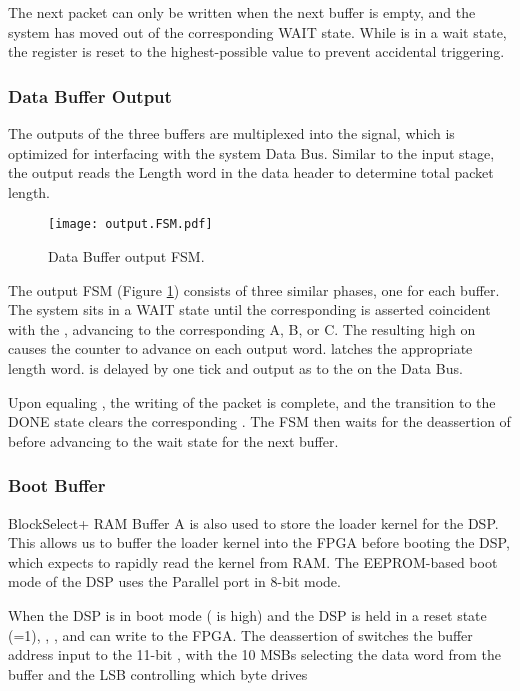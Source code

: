 The next packet can only be written when the next buffer is empty, and
the system has moved out of the corresponding WAIT state. While
 is in a wait state, the  register is
reset to the highest-possible value to prevent accidental triggering.
      
\subsubsection{Data Buffer Output}
      
The outputs of the three buffers are multiplexed into the
 signal, which is optimized for interfacing with
the system Data Bus. Similar to the input stage, the output reads the
Length word in the data header to determine total packet length.

\begin{figure}[h]
  \texttt{[image: output.FSM.pdf]}
  \caption{Data Buffer output FSM.}
  \label{OutputFSM}
\end{figure}
The output FSM  (Figure \ref{OutputFSM}) consists of
three similar phases, one for each buffer. The system sits in a WAIT
state until the corresponding  is asserted
coincident with the , advancing to the corresponding
A, B, or C. The resulting high on  causes the
 counter to advance on each output word.
 latches the appropriate length word.
 is delayed by one tick and output as
 to the  on the Data Bus.

Upon  equaling , the writing
of the packet is complete, and the transition to the DONE state clears
the corresponding . The FSM then waits for the
deassertion of  before advancing to the wait state for
the next buffer.
   
\subsubsection{Boot Buffer}

BlockSelect+ RAM Buffer A is also used to store the loader kernel for
the DSP. This allows us to buffer the loader kernel into the FPGA
before booting the DSP, which expects to rapidly read the kernel from
RAM. The EEPROM-based boot mode of the DSP uses the Parallel port in
8-bit mode.

When the DSP is in boot mode ( is high) and the DSP is
held in a reset state (=1), ,
, and  can write to the FPGA. The
deassertion of  switches the buffer address input to
the 11-bit , with the 10 MSBs selecting the data word
from the buffer and the LSB controlling which byte drives

